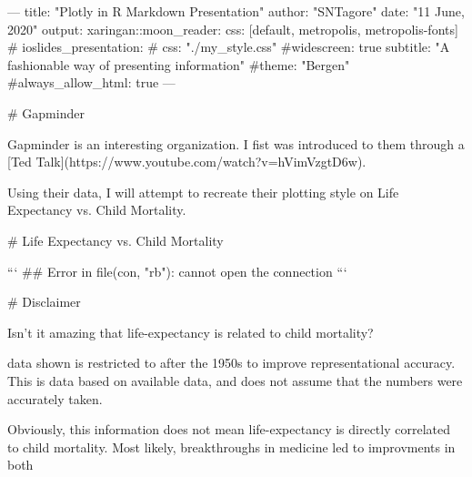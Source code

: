 ---
title: "Plotly in R Markdown Presentation"
author: "SNTagore"
date: "11 June, 2020"
output:
  xaringan::moon_reader:
    css: [default, metropolis, metropolis-fonts]
#  ioslides_presentation:
#    css: "./my_style.css"
#widescreen: true
subtitle: "A fashionable way of presenting information"
#theme: "Bergen"
#always_allow_html: true
---




# Gapminder

Gapminder is an interesting organization. I fist was introduced to them through a [Ted
Talk](https://www.youtube.com/watch?v=hVimVzgtD6w).

Using their data, I will attempt to recreate their plotting style on Life Expectancy vs. Child Mortality.

# Life Expectancy vs. Child Mortality






```
## Error in file(con, "rb"): cannot open the connection
```

# Disclaimer

Isn't it amazing that life-expectancy is related to child mortality?

data shown is restricted to after the 1950s to improve representational accuracy. This is data based
on available data, and does not assume that the numbers were accurately taken.

Obviously, this information does not mean life-expectancy is directly correlated to child
mortality. Most likely, breakthroughs in medicine led to improvments in both
